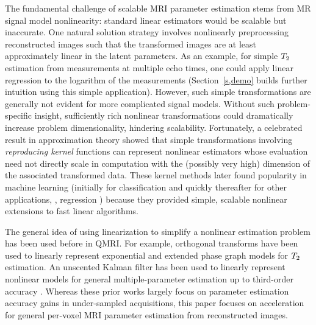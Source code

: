 The fundamental challenge 
of scalable MRI parameter estimation
stems from MR signal model nonlinearity:
standard linear estimators
would be scalable but inaccurate.
One natural solution strategy
involves nonlinearly preprocessing reconstructed images
such that the transformed images 
are at least approximately linear
in the latent parameters.
As an example,
for simple $T_2$ estimation
from measurements at multiple echo times,
one could apply linear regression
to the logarithm of the measurements
(Section~\ref{s,demo} builds further intuition
using this simple application).
However,
such simple transformations
are generally not evident 
for more complicated signal models.
Without such problem-specific insight,
sufficiently rich nonlinear transformations
could dramatically increase problem dimensionality,
hindering scalability.
Fortunately, 
a celebrated result
in approximation theory \cite{kimeldorf:70:acb} showed
that simple transformations involving
\emph{reproducing kernel} functions \cite{aronszajn:50:tor}
can represent nonlinear estimators
whose evaluation need not directly scale in computation
with the (possibly very high) dimension
of the associated transformed data.
These kernel methods later found popularity
in machine learning
(initially for classification \cite{cortes:95:svn}
and quickly thereafter for other applications,
\eg, regression \cite{saunders:98:rrl})
because they provided simple, scalable nonlinear extensions
to fast linear algorithms.

The general idea
of using linearization
to simplify a nonlinear estimation problem
has been used before in QMRI.
For example,
orthogonal transforms
have been used
to linearly represent 
exponential \cite{huang:12:tmf}
and extended phase graph \cite{huang:13:trw} models
for $T_2$ estimation.
An unscented Kalman filter 
has been used 
to linearly represent nonlinear models
for general multiple-parameter estimation
up to third-order accuracy \cite{zhao:16:daa}.
Whereas these prior works largely focus
on parameter estimation accuracy gains 
in under-sampled acquisitions,
this paper focuses on acceleration 
for general per-voxel MRI parameter estimation
from reconstructed images.

